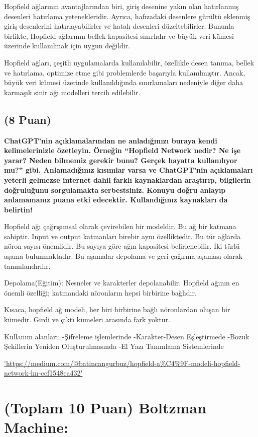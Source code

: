 \documentclass[11pt]{article}
\begin{document}
Hopfield ağlarının avantajlarından biri, giriş desenine yakın olan hatırlanmış desenleri hatırlama yetenekleridir. Ayrıca, hafızadaki desenlere gürültü eklenmiş giriş desenlerini hatırlayabilirler ve hatalı desenleri düzeltebilirler. Bununla birlikte, Hopfield ağlarının bellek kapasitesi sınırlıdır ve büyük veri kümesi üzerinde kullanılmak için uygun değildir.

Hopfield ağları, çeşitli uygulamalarda kullanılabilir, özellikle desen tanıma, bellek ve hatırlama, optimize etme gibi problemlerde başarıyla kullanılmıştır. Ancak, büyük veri kümesi üzerinde kullanıldığında sınırlamaları nedeniyle diğer daha karmaşık sinir ağı modelleri tercih edilebilir.


\subsection{(8 Puan)} \textbf{ChatGPT’nin açıklamalarından ne anladığınızı buraya kendi kelimelerinizle özetleyin. Örneğin ``Hopfield Network nedir? Ne işe yarar? Neden bilmemiz gerekir bunu? Gerçek hayatta kullanılıyor mu?'' gibi. Anlamadığınız kısımlar varsa ve ChatGPT’nin açıklamaları yeterli gelmezse internet dahil farklı kaynaklardan araştırıp, bilgilerin doğruluğunu sorgulamakta serbestsiniz. Konuyu doğru anlayıp anlamamanız puana etki edecektir. Kullandığınız kaynakları da belirtin!}

Hopfield ağı çağrışımsal olarak çevirebilen bir modeldir. Bu ağ bir katmana sahiptir. Input ve output katmanları birebir aynı özelliktedir. Bu tür ağlarda nöron sayısı önemlidir. Bu sayıya göre ağın kapasitesi belirlenebilir. İki türlü aşama bulunmaktadır. Bu aşamalar depolama ve geri çağırma aşaması olarak tanımlandırılır.

Depolama(Eğitim): Nesneler ve karakterler depolanabilir.
Hopfield ağının en önemli özelliği; katmandaki nöronların hepsi birbirine bağlıdır.

Kısaca, hopfield ağ modeli, her biri birbirine bağlı nöronlardan oluşan bir kümedir. Girdi ve çıktı kümeleri arasında fark yoktur.

Kullanım alanları;
-Şifreleme işlemlerinde
-Karakter-Desen Eşleştirmede
-Bozuk Şekillerin Yeniden Oluşturulmasında
-El Yazı Tanımlama Sistemlerinde

\url{'https://medium.com/@batincangurbuz/hopfield-a%C4%9F-modeli-hopfield-network-hn-ccf1548ca432'}

\section{(Toplam 10 Puan) Boltzman Machine:}
\end{document}
